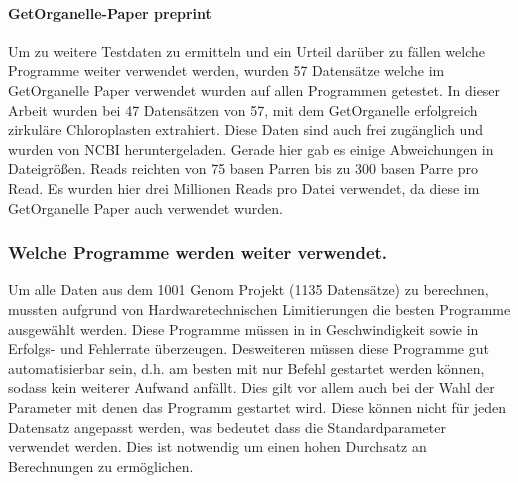 \documentclass{scrartcl}
\begin{document}
\paragraph{GetOrganelle-Paper preprint}
\label{sec-3-1-1-3}
Um zu weitere Testdaten zu ermitteln und ein Urteil darüber zu fällen welche Programme weiter verwendet werden,
wurden 57 Datensätze welche im GetOrganelle Paper \footnotemark[22]{} verwendet wurden
auf allen Programmen getestet. In dieser Arbeit wurden bei 47 Datensätzen von 57, mit
dem GetOrganelle erfolgreich zirkuläre Chloroplasten extrahiert. Diese Daten sind auch frei zugänglich und wurden
von NCBI heruntergeladen. Gerade hier gab es einige Abweichungen in Dateigrößen. Reads reichten von 75 basen Parren 
bis zu 300 basen Parre pro Read. Es wurden hier drei Millionen Reads pro Datei verwendet, da diese im GetOrganelle Paper
auch verwendet wurden.


\subsubsection{Welche Programme werden weiter verwendet.}
\label{sec-3-1-2}
Um alle Daten aus dem 1001 Genom Projekt (1135 Datensätze) zu berechnen, mussten aufgrund 
von Hardwaretechnischen Limitierungen die besten Programme ausgewählt werden. Diese Programme müssen in
in Geschwindigkeit sowie in Erfolgs- und Fehlerrate überzeugen. Desweiteren müssen diese Programme gut automatisierbar sein, 
d.h. am besten mit nur Befehl gestartet werden können, sodass kein weiterer Aufwand anfällt. Dies gilt
vor allem auch bei der Wahl der Parameter mit denen das Programm gestartet wird. Diese können nicht 
für jeden Datensatz angepasst werden, was bedeutet dass die Standardparameter verwendet werden.
Dies ist notwendig um einen hohen Durchsatz an Berechnungen zu ermöglichen.
\end{document}
